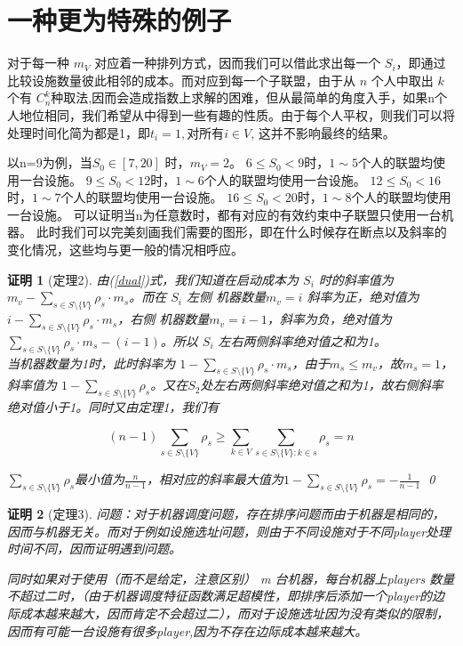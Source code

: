 \documentclass[UTF8]{article}
\newtheorem{pf}{\hspace{2em}证明}
\begin{document}
\section{一种更为特殊的例子}
对于每一种 $m_V$ 对应着一种排列方式，因而我们可以借此求出每一个 $S_i$，即通过比较设施数量彼此相邻的成本。而对应到每一个子联盟，由于从 $n$ 个人中取出 $k$ 个有 $C^k_n$种取法,因而会造成指数上求解的困难，但从最简单的角度入手，如果n个人地位相同，我们希望从中得到一些有趣的性质。由于每个人平权，则我们可以将处理时间化简为都是1，即$t_i=1, \text{对所有} i \in V$, 这并不影响最终的结果。
\par
以n=9为例，当$ S_0 \in [7,20]$ 时，$m_V=2$。
$6 \leq S_0 < 9 $时，$1 \sim 5$个人的联盟均使用一台设施。
$9 \leq S_0 < 12 $时，$1 \sim 6$个人的联盟均使用一台设施。
$12 \leq S_0 < 16 $时，$1 \sim 7$个人的联盟均使用一台设施。
$16 \leq S_0 < 20 $时，$1 \sim 8$个人的联盟均使用一台设施。
可以证明当n为任意数时，都有对应的有效约束中子联盟只使用一台机器。
此时我们可以完美刻画我们需要的图形，即在什么时候存在断点以及斜率的变化情况，这些均与更一般的情况相呼应。


\begin{pf}[定理2]

由(\ref{dual})式，我们知道在启动成本为 $S_i$ 时的斜率值为$m_v-\sum_{s\in S \setminus\{V\}} \rho_s \cdot m_s$。而在 $S_i$ 左侧 机器数量$m_v=i$ 斜率为正，绝对值为$i-\sum_{s\in S \setminus\{V\}} \rho_s \cdot m_s$，右侧 机器数量$m_v=i-1$，斜率为负，绝对值为
$\sum_{s\in S \setminus\{V\}} \rho_s \cdot m_s - (i-1) $。所以 $S_i$ 左右两侧斜率绝对值之和为1。\\
当机器数量为1时，此时斜率为 $1-\sum_{s\in S \setminus\{V\}} \rho_s \cdot m_s$，由于$m_s \leq m_v$，故$m_s=1$，斜率值为 $1-\sum_{s\in S \setminus\{V\}} \rho_s $。又在$S_2$处左右两侧斜率绝对值之和为1，故右侧斜率绝对值小于1。同时又由定理1，我们有

\begin{displaymath}
  (n-1) \sum_{s \in S \setminus\{V\} } \rho_s \geq
  \sum_{k\in V}\sum_{s \in S \setminus\{V\}:k \in s} \rho_s = n
\end{displaymath}

$\sum_{s \in S \setminus\{V\}} \rho_s $最小值为$\frac{n}{n-1}$，相对应的斜率最大值为$ 1-\sum_{s\in S \setminus\{V\}} \rho_s =-\frac{1}{n-1}$
\qed
\end{pf}



\begin{pf}[定理3]


问题：对于机器调度问题，存在排序问题而由于机器是相同的，因而与机器无关。而对于例如设施选址问题，则由于不同设施对于不同player处理时间不同，因而证明遇到问题。

同时如果对于使用（而不是给定，注意区别） m 台机器，每台机器上players 数量不超过二时，（由于机器调度特征函数满足超模性，即排序后添加一个player的边际成本越来越大，因而肯定不会超过二），而对于设施选址因为没有类似的限制，因而有可能一台设施有很多player,因为不存在边际成本越来越大。

\end{pf}
\end{document}
